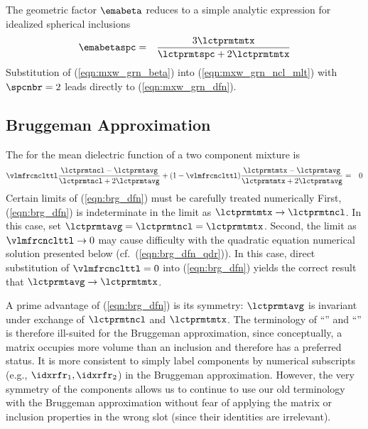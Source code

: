 \documentclass[12pt,twoside]{book}
\begin{document}
The geometric factor $\emabeta$ reduces to a simple analytic expression
for idealized spherical inclusions 
\begin{eqnarray}
\emabetaspc & = & \frac{3\lctprmtmtx}{\lctprmtspc+2\lctprmtmtx}
\label{eqn:mxw_grn_beta}
\end{eqnarray}
Substitution of (\ref{eqn:mxw_grn_beta}) into
(\ref{eqn:mxw_grn_ncl_mlt}) with $\spcnbr = 2$ leads directly to
(\ref{eqn:mxw_grn_dfn}). 

\subsection[Bruggeman Approximation]{Bruggeman Approximation}\label{sxn:brg_apx}
The  \cite[]{Bru35} for the mean
dielectric function of a two component mixture is \cite[]{BoH83}
\begin{eqnarray}
\vlmfrcnclttl \frac{\lctprmtncl - \lctprmtavg}{\lctprmtncl + 2 \lctprmtavg }
+ ( 1 - \vlmfrcnclttl )
\frac{\lctprmtmtx - \lctprmtavg}{\lctprmtmtx + 2 \lctprmtavg }
& = & 0
\label{eqn:brg_dfn}
\end{eqnarray}
Certain limits of (\ref{eqn:brg_dfn}) must be carefully treated
numerically 
First, (\ref{eqn:brg_dfn}) is indeterminate in the limit as
$\lctprmtmtx \rightarrow \lctprmtncl$.
In this case, set $\lctprmtavg = \lctprmtncl = \lctprmtmtx$.
Second, the limit as $\vlmfrcnclttl \rightarrow 0$ may cause difficulty
with the quadratic equation numerical solution presented below
(cf.\ (\ref{eqn:brg_dfn_qdr})).
In this case, direct substitution of $\vlmfrcnclttl = 0$ into
(\ref{eqn:brg_dfn}) yields the correct result that
$\lctprmtavg \rightarrow \lctprmtmtx$.

A prime advantage of (\ref{eqn:brg_dfn}) is its symmetry: 
$\lctprmtavg$ is invariant under exchange of $\lctprmtncl$ and
$\lctprmtmtx$. 
The terminology of ``'' and ``''
is therefore ill-suited for the Bruggeman approximation, since
conceptually, a matrix occupies more volume than an inclusion
and therefore has a preferred status.
It is more consistent to simply label components by numerical
subscripts (e.g., $\idxrfr_{1}, \idxrfr_{2}$) in the Bruggeman
approximation.
However, the very symmetry of the components allows us to continue
to use our old terminology with the Bruggeman approximation without
fear of applying the matrix or inclusion properties in the wrong slot
(since their identities are irrelevant).
\end{document}
